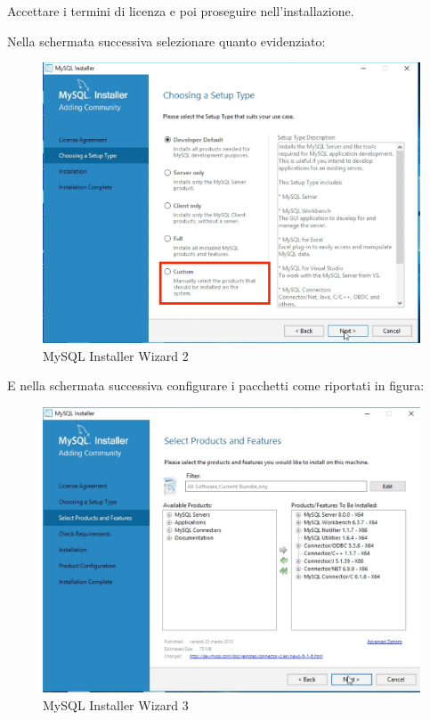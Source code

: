 \begin{itemize}
Accettare i termini di licenza e poi proseguire nell’installazione. 

Nella schermata successiva selezionare quanto evidenziato: 

\begin{center}
\begin{figure}[H]
\centering
\includegraphics[scale=1]{figures/mySQLinstaller_wizard2.png}
\caption{MySQL Installer Wizard 2}
\end{figure}
\end{center}

E nella schermata successiva configurare i pacchetti come riportati in figura: 

\begin{center}
\begin{figure}[H]
\centering
\includegraphics[scale=1]{figures/mySQLinstaller_wizard3.png}
\caption{MySQL Installer Wizard 3}
\end{figure}
\end{center}


\end{itemize}
